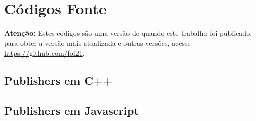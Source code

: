 \section{Códigos Fonte}
\label{section:codigos_fonte}

\textbf{Atenção:} Estes códigos são uma versão de quando este trabalho foi publicado, para obter a versão mais atualizada e outras versões, acesse \url{https://github.com/fol21}.

\subsection{Publishers em C++}
\label{subsection:publishers_cpp}












\subsection{Publishers em Javascript}
\label{subsection:publishers_javascript}








